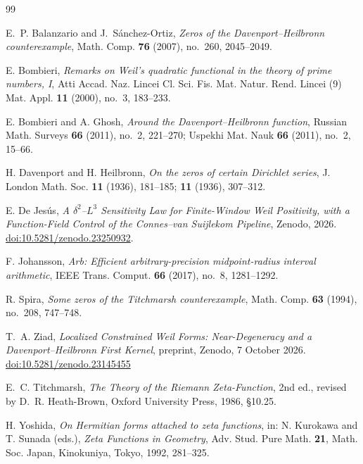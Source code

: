 \documentclass[11pt,a4paper]{article}
\theoremstyle{definition}
\theoremstyle{remark}
\begin{document}
\begin{thebibliography}{99}

 E.~P. Balanzario and J.~S\'anchez-Ortiz,
\emph{Zeros of the Davenport--Heilbronn counterexample},
Math. Comp. \textbf{76} (2007), no.~260, 2045--2049.

 E. Bombieri,
\emph{Remarks on Weil's quadratic functional in the theory of prime numbers, I},
Atti Accad. Naz. Lincei Cl. Sci. Fis. Mat. Natur. Rend. Lincei (9) Mat. Appl. \textbf{11}
(2000), no.~3, 183--233.

 E. Bombieri and A. Ghosh,
\emph{Around the Davenport--Heilbronn function},
Russian Math. Surveys \textbf{66} (2011), no.~2, 221--270;
Uspekhi Mat. Nauk \textbf{66} (2011), no.~2, 15--66.

 H. Davenport and H. Heilbronn,
\emph{On the zeros of certain Dirichlet series},
J. London Math. Soc. \textbf{11} (1936), 181--185; \textbf{11} (1936), 307--312.

 E. De Jes\'us,
\emph{A $\delta^2$--$L^3$ Sensitivity Law for Finite-Window Weil Positivity, with a
Function-Field Control of the Connes--van Suijlekom Pipeline}, Zenodo, 2026.
\href{https://doi.org/10.5281/zenodo.23250932}{doi:10.5281/zenodo.23250932}.

 F. Johansson,
\emph{Arb: Efficient arbitrary-precision midpoint-radius interval arithmetic},
IEEE Trans. Comput. \textbf{66} (2017), no.~8, 1281--1292.

 R. Spira,
\emph{Some zeros of the Titchmarsh counterexample},
Math. Comp. \textbf{63} (1994), no.~208, 747--748.

 T.~A. Ziad,
\emph{Localized Constrained Weil Forms: Near-Degeneracy and a Davenport--Heilbronn First
Kernel}, preprint, Zenodo, 7 October 2026.
\href{https://doi.org/10.5281/zenodo.23145455}{doi:10.5281/zenodo.23145455}

 E.~C. Titchmarsh,
\emph{The Theory of the Riemann Zeta-Function}, 2nd ed., revised by D.~R. Heath-Brown,
Oxford University Press, 1986, \S10.25.

 H. Yoshida,
\emph{On Hermitian forms attached to zeta functions},
in: N. Kurokawa and T. Sunada (eds.), \emph{Zeta Functions in Geometry},
Adv. Stud. Pure Math. \textbf{21}, Math. Soc. Japan, Kinokuniya, Tokyo, 1992, 281--325.

\end{thebibliography}
\end{document}
